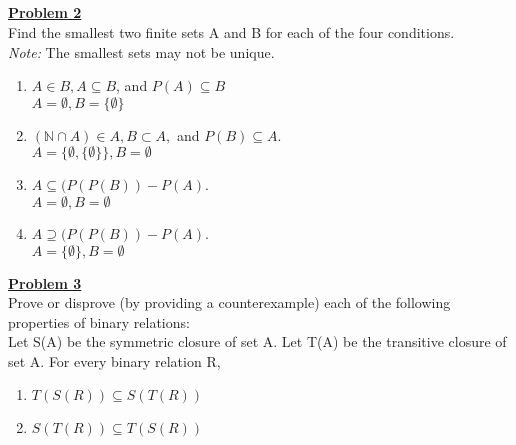 \documentclass[11pt]{article}
\begin{document}
\ \\\\\\\\\\\\\\\\\\
	\noindent\textbf{\underline{Problem 2}}\\
	Find the smallest two finite sets A and B for each of the four conditions.\\
\textit{Note:} The smallest sets may not be unique.

	\begin{enumerate}
		\item $A \in B, A \subseteq B$, and $P(A) \subseteq B$\\

			$A = \emptyset , B = \{ \emptyset \}$\\
		\item $( \mathbb{N} \cap A ) \in A, B \subset A,$ and $P(B) \subseteq A.$\\

			$A = \{ \emptyset, \{ \emptyset \} \} , B = \emptyset$\\
		\item $A \subseteq (P (P(B)) - P(A)$.\\

			$A = \emptyset, B = \emptyset$\\
		\item $A \supseteq (P (P(B)) - P(A)$.\\

			$A = \{ \emptyset \} , B = \emptyset$
	
	\end{enumerate}

	\noindent\textbf{\underline{Problem 3}}\\
	Prove or disprove (by providing a counterexample) each of the following properties of binary relations:\\
	Let S(A) be the symmetric closure of set A. Let T(A) be the transitive closure of set A. For every binary relation R, 

	\begin{enumerate}
		\item $T(S(R)) \subseteq S(T(R))$
		\item $S(T(R)) \subseteq T(S(R))$
	\end{enumerate}
\end{document}
